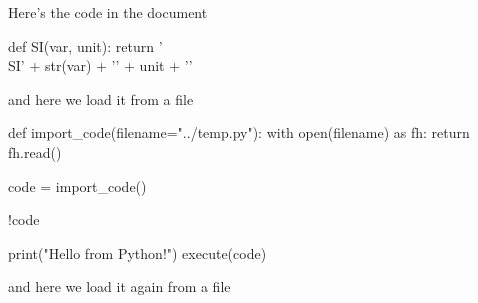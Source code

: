 \documentclass[12 pt]{article}
\begin{document}
Here's the code in the document
\begin{pyverbatim}
def SI(var, unit):
     return '\\SI{' + str(var) + '}{' + unit + '}'
\end{pyverbatim}
and here we load it from a file

\begin{pycode}[temp] 
def import_code(filename="../temp.py"):
    with open(filename) as fh:
        return fh.read()
        
code = import_code()
\end{pycode}

\begin{pysub}[temp] 
  \begin{pyverbatim}
!{code}    
  \end{pyverbatim}
\end{pysub}

\begin{pycode}[temp]
print("Hello from Python!")
execute(code)
\end{pycode}

and here we load it again from a file

\end{document}
